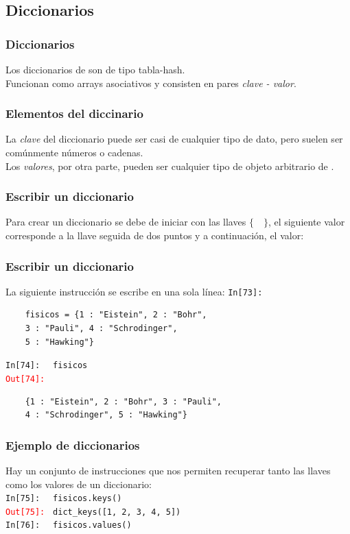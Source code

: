 \documentclass[12pt]{beamer}
\begin{document}
{\subsection{Diccionarios}
\begin{frame}
\frametitle{Diccionarios}
Los diccionarios de \python{} son de tipo tabla-hash.
\\
\bigskip
Funcionan como arrays asociativos y consisten en pares \emph{clave - valor}.
\end{frame}
\begin{frame}
\frametitle{Elementos del diccinario}
La \emph{clave} del diccionario puede ser casi de cualquier tipo  de dato, pero suelen ser comúnmente números o cadenas.
\\
\bigskip
Los \emph{valores}, por otra parte, pueden ser cualquier tipo de objeto arbitrario de \python.
\end{frame}
\begin{frame}[fragile]
\frametitle{Escribir un diccionario}
Para crear un diccionario se debe de iniciar con las llaves $\{ \quad \}$, el siguiente valor corresponde a la llave seguida de dos puntos y a continuación, el valor:
\end{frame}
\begin{frame}[fragile]
\frametitle{Escribir un diccionario}
La siguiente instrucción se escribe en una sola línea:
\textcolor{ao}{\texttt{In[73]: }}
\\
\begin{verbatim}
	fisicos = {1 : "Eistein", 2 : "Bohr", 
	3 : "Pauli", 4 : "Schrodinger", 
	5 : "Hawking"}
\end{verbatim}
\pause
\textcolor{ao}{\texttt{In[74]: }} \verb| fisicos|
\\
\pause
\textcolor{red}{\texttt{Out[74]: }}
\\
\begin{verbatim}
	{1 : "Eistein", 2 : "Bohr", 3 : "Pauli",
	4 : "Schrodinger", 5 : "Hawking"}
\end{verbatim}
\end{frame}
\begin{frame}[fragile]
\frametitle{Ejemplo de diccionarios}
Hay un conjunto de instrucciones que nos permiten recuperar tanto las llaves como los valores de un diccionario:
\\
\bigskip
\textcolor{ao}{\texttt{In[75]: }} \verb| fisicos.keys()|
\\
\pause
\textcolor{red}{\texttt{Out[75]: }} \verb|dict_keys([1, 2, 3, 4, 5])|
\\
\bigskip
\textcolor{ao}{\texttt{In[76]: }} \verb| fisicos.values()|

\end{frame}}
\end{document}
